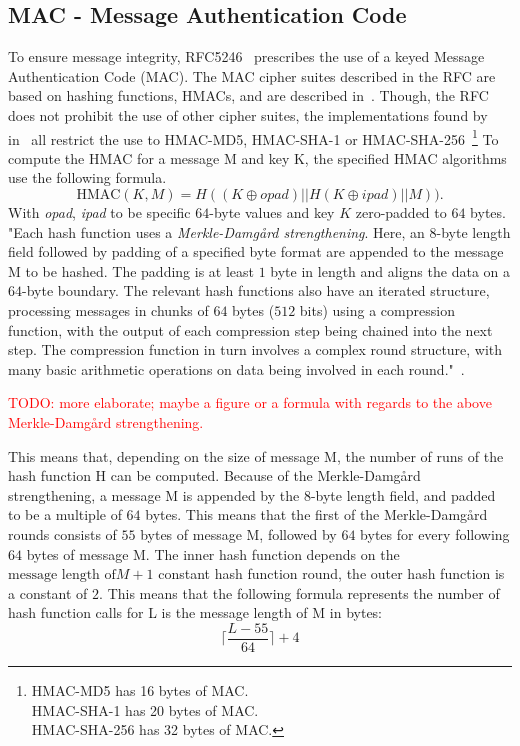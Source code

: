 \documentclass[10pt,conference,a4paper]{IEEEtran}
\begin{document}
\subsection{MAC - Message Authentication Code}
\label{sec:crypto:hmac}
To ensure message integrity, RFC5246~\cite{ietf2008transport} prescribes the use of a keyed Message Authentication Code (MAC). The MAC cipher suites described in the RFC are based on hashing functions, HMACs, and are described in~\cite{krawczyk1997rfc}. Though, the RFC does not prohibit the use of other cipher suites, the implementations found by~\citeauthor{alfardan2013lucky} in~\cite{alfardan2013lucky} all restrict the use to HMAC-MD5, HMAC-SHA-1 or HMAC-SHA-256~\footnote{HMAC-MD5 has 16 bytes of MAC.\\HMAC-SHA-1 has 20 bytes of MAC.\\HMAC-SHA-256 has 32 bytes of MAC.} To compute the HMAC for a message M and key K, the specified HMAC algorithms use the following formula. 
\[ \text{HMAC}(K,M) = H((K \oplus opad)||H(K \oplus ipad)||M)). \]
With \textit{opad}, \textit{ipad} to be specific $64$-byte values and key $K$ zero-padded to $64$ bytes. "Each hash function uses a \textit{Merkle-Damg\aa rd strengthening}. Here, an 8-byte length field followed by padding of a specified byte format are appended to the message M to be hashed. The padding is at least $1$ byte in length and aligns the data on a $64$-byte boundary. The relevant hash functions also have an iterated structure, processing messages in chunks of $64$ bytes ($512$ bits) using a compression function, with the output of each compression step being chained into the next step. The compression function in turn involves a complex round structure, with many basic arithmetic operations on data being involved in each round."~\cite{alfardan2013lucky}.

\textcolor{red}{TODO: more elaborate; maybe a figure or a formula with regards to the above Merkle-Damg\aa rd strengthening.}

This means that, depending on the size of message M, the number of runs of the hash function H can be computed. Because of the Merkle-Damg\aa rd strengthening, a message M is appended by the $8$-byte length field, and padded to be a multiple of $64$ bytes. This means that the first of the Merkle-Damg\aa rd rounds consists of $55$ bytes of message M, followed by $64$ bytes for every following $64$ bytes of message M. The inner hash function depends on the $\text{message length of} M + 1$ constant hash function round, the outer hash function is a constant of $2$. This means that the following formula represents the number of hash function calls for L is the message length of M in bytes:
\[ \lceil \frac{L - 55}{64} \rceil + 4 \]
\end{document}

